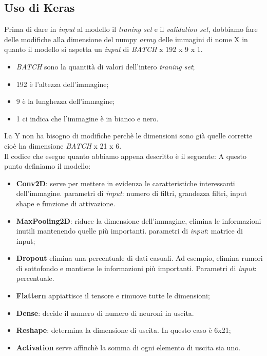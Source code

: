 \subsection{Uso di Keras}
Prima di dare in \textit{input} al modello il \textit{traning set} e il \textit{validation set}, dobbiamo fare delle modifiche alla dimensione del numpy \textit{array} delle immagini di nome X in quanto il modello si aspetta un \textit{input} di \textit{BATCH} x 192 x 9 x 1.
\begin{itemize}
	\item \textit{BATCH} sono la quantità di valori dell'intero \textit{traning set};
	\item 192 è l'altezza dell'immagine;
	\item 9 è la lunghezza dell'immagine;
	\item 1 ci indica che l'immagine è in bianco e nero.
\end{itemize}
La Y non ha bisogno di modifiche perchè le dimensioni sono già quelle corrette cioè ha dimensione \textit{BATCH} x 21 x 6.\\
\newline
Il codice che esegue quanto abbiamo appena descritto è il seguente:
\vspace*{2ex}
\vspace*{2ex}
A questo punto definiamo il modello:
\begin{itemize}
	\item \textbf{Conv2D}: serve per mettere in evidenza le caratteristiche interessanti dell'immagine. parametri di \textit{input}: numero di filtri, grandezza filtri, input shape e funzione di attivazione.
	\item \textbf{MaxPooling2D}: riduce la dimensione dell'immagine, elimina le informazioni inutili mantenendo quelle più importanti. parametri di \textit{input}: matrice di input;
	\item \textbf{Dropout} elimina una percentuale di dati casuali. Ad esempio, elimina rumori di sottofondo e mantiene le informazioni più importanti. Parametri di \textit{input}: percentuale.
	\item \textbf{Flattern} appiattisce il tensore e rimuove tutte le dimensioni;
	\item \textbf{Dense}: decide il numero di numero di neuroni in uscita.
	\item \textbf{Reshape}: determina la dimensione di uscita. In questo caso è 6x21;
	\item \textbf{Activation} serve affinchè la somma di ogni elemento di uscita sia uno.
\end{itemize}
